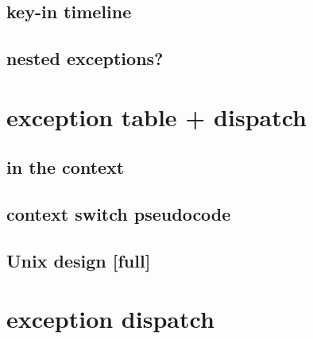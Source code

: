 \subsection{key-in timeline}


\subsection{nested exceptions?}


\section{exception table + dispatch}


\subsection{in the context}


\subsection{context switch pseudocode}


\subsection{Unix design [full]}


\section{exception dispatch}


